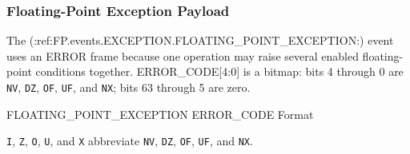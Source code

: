 \subsubsection{Floating-Point Exception Payload}

The (:ref:FP.events.EXCEPTION.FLOATING_POINT_EXCEPTION:) event uses an ERROR frame because one operation may raise several enabled
floating-point conditions together. ERROR\_CODE[4:0] is a bitmap: bits 4 through 0 are \texttt{NV}, \texttt{DZ},
\texttt{OF}, \texttt{UF}, and \texttt{NX}; bits 63 through 5 are zero.

\begin{BedrockListedFormatDiagram}{FLOATING\_POINT\_EXCEPTION ERROR\_CODE Format}
\end{BedrockListedFormatDiagram}
{\small
\texttt{I}, \texttt{Z}, \texttt{O}, \texttt{U}, and \texttt{X} abbreviate \texttt{NV}, \texttt{DZ},
\texttt{OF}, \texttt{UF}, and \texttt{NX}.
\par}
